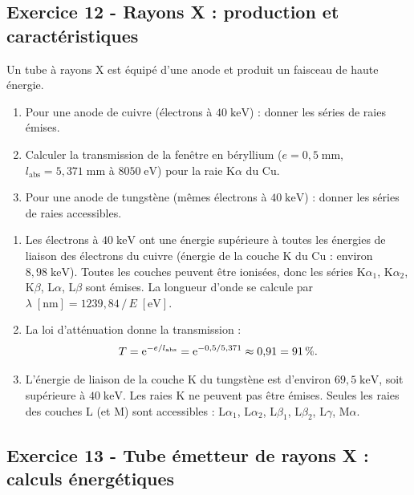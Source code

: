 \documentclass[12pt,a4paper]{article}
\begin{document}
\subsection*{Exercice 12 - Rayons X : production et caractéristiques \niveau{\moyen}}

\begin{boiteexercice}
\niveau{\moyen}
Un tube à rayons X est équipé d'une anode et produit un faisceau de haute énergie.
\begin{enumerate}
  \item Pour une anode de cuivre (électrons à $40\;\text{keV}$) : donner les séries de raies émises.
  \item Calculer la transmission de la fenêtre en béryllium ($e=0{,}5\;\text{mm}$, $l_\text{abs}=5{,}371\;\text{mm}$ à $8050\;\text{eV}$) pour la raie $\text{K}\alpha$ du Cu.
  \item Pour une anode de tungstène (mêmes électrons à $40\;\text{keV}$) : donner les séries de raies accessibles.
\end{enumerate}
\end{boiteexercice}

\begin{boitecorrige}
\begin{enumerate}
\item Les électrons à $40\;\text{keV}$ ont une énergie supérieure à toutes les énergies de liaison des électrons du cuivre (énergie de la couche K du Cu : environ $8{,}98\;\text{keV}$). Toutes les couches peuvent être ionisées, donc les séries K$\alpha_1$, K$\alpha_2$, K$\beta$, L$\alpha$, L$\beta$ sont émises. La longueur d'onde se calcule par $\lambda\;[\text{nm}] = 1239{,}84\,/\,E\;[\text{eV}]$.

\item La loi d'atténuation donne la transmission :
\[
T = \mathrm{e}^{-e/l_\text{abs}} = \mathrm{e}^{-0{,}5/5{,}371} \approx 0{,}91 = 91\,\%.
\]

\item L'énergie de liaison de la couche K du tungstène est d'environ $69{,}5\;\text{keV}$, soit supérieure à $40\;\text{keV}$. Les raies K ne peuvent pas être émises. Seules les raies des couches L (et M) sont accessibles : L$\alpha_1$, L$\alpha_2$, L$\beta_1$, L$\beta_2$, L$\gamma$, M$\alpha$.
\end{enumerate}
\end{boitecorrige}

\subsection*{Exercice 13 - Tube émetteur de rayons X : calculs énergétiques \niveau{\moyen}}
\end{document}

